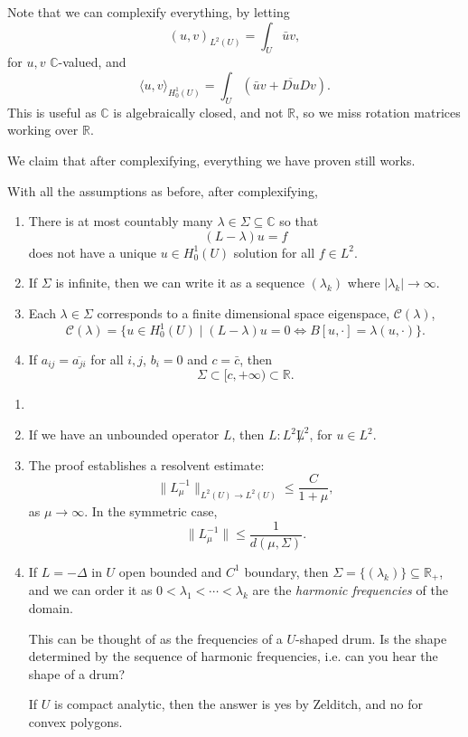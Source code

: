 \documentclass[12pt]{article}
\begin{document}
Note that we can complexify everything, by letting
\[
	(u, v)_{L^2(U)} = \int_U \bar u v,
\]
for $u, v$ $\mathbb{C}$-valued, and
\[
\langle u, v \rangle_{H^1_0(U)} = \int_U (\bar u v + \overline{D u} Dv ).
\]
This is useful as $\mathbb{C}$ is algebraically closed, and not $\mathbb{R}$, so we miss rotation matrices working over $\mathbb{R}$.

We claim that after complexifying, everything we have proven still works.

\begin{theorem}[Spectrum of $L$]
	With all the assumptions as before, after complexifying,
	\begin{enumerate}[\normalfont(i)]
		\item There is at most countably many $\lambda \in \Sigma \subseteq \mathbb{C}$ so that
			\[
				(L - \lambda) u = f
			\]
			does not have a unique $u \in H^1_0(U)$ solution for all $f \in L^2$.
		\item If $\Sigma$ is infinite, then we can write it as a sequence $(\lambda_k)$ where $|\lambda_k| \to \infty$.
		\item Each $\lambda \in \Sigma$ corresponds to a finite dimensional space eigenspace, $\mathcal{C}(\lambda)$,
			\[
				\mathcal{C}(\lambda) = \{ u \in H^1_0(U) \mid (L - \lambda) u = 0 \iff B[u, \cdot] = \lambda(u, \cdot) \}.
			\]
		\item If $a_{ij} = \overline{a_{ji}}$ for all $i, j$, $b_i = 0$ and $c = \bar c$, then
			\[
			\Sigma \subset [c, +\infty) \subset \mathbb{R}.
			\]
	\end{enumerate}	
\end{theorem}

\begin{remark}
	\begin{enumerate}
		\item[]
		\item If we have an unbounded operator $L$, then $L : L^2 \not L^2$, for $u \in L^2$.
		\item The proof establishes a resolvent estimate:
			\[
			\|L_{\mu}^{-1}\|_{L^2(U) \to L^2(U)} \leq \frac{C}{1 + \mu},
			\]
			as $\mu \to \infty$. In the symmetric case,
			\[
			\|L_\mu^{-1}\| \leq \frac{1}{d(\mu, \Sigma)}.
			\]
		\item If $L = - \Delta$ in $U$ open bounded and $C^1$ boundary, then $\Sigma = \{(\lambda_k)\} \subseteq \mathbb{R}_+$, and we can order it as $0 < \lambda_1 < \cdots < \lambda_k$ are the \emph{harmonic frequencies} of the domain.

			This can be thought of as the frequencies of a $U$-shaped drum. Is the shape determined by the sequence of harmonic frequencies, i.e. can you hear the shape of a drum?

			If $U$ is compact analytic, then the answer is yes by Zelditch, and no for convex polygons.
	\end{enumerate}	
\end{remark}
\end{document}
